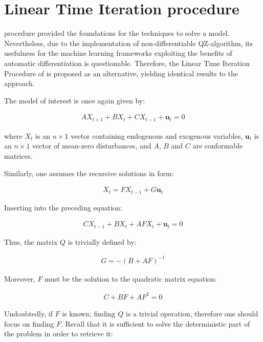 \documentclass{pracamgr}
\numberwithin{equation}{section}
\begin{document}
\section{Linear Time Iteration procedure} \label{LTI}

\citet{uhlig1998toolkit} procedure provided the foundations for the techniques to solve a  \citet{smets2003estimated} model. Nevertheless, due to the implementation of non-differentiable QZ-algorithm, its usefulness for the machine learning frameworks exploiting the benefits of automatic differentiation is questionable. Therefore, the Linear Time Iteration Procedure of \cite{rendahl2017linear} is proposed as an alternative, yielding identical results to the \citet{uhlig1998toolkit} approach.

The model of interest is once again given by:

\begin{align}
AX_{t+1} + BX_{t} + CX_{t-1} + \mathbf{u}_{t} = 0
\end{align}

where $X_{t}$ is an $n \times 1$ vector containing endogenous and exogenous variables, $\mathbf{u}_{t}$ is an $n \times 1$ vector of mean-zero disturbances, and $A$, $B$ and $C$ are conformable matrices.

Similarly, one assumes the recursive solutions in form:

\begin{align}
X_{t} = FX_{t-1} + G\mathbf{u}_{t}
\end{align}

Inserting into the preceding equation:

\begin{align}
CX_{t-1} + BX_{t} + AFX_{t} + \mathbf{u}_{t} = 0
\end{align}

Thus, the matrix $Q$ is trivially defined by:

\begin{align}
G = -\left( B + AF \right)^{-1}
\end{align}

Moreover, $F$ must be the solution to the quadratic matrix equation:

\begin{align}
C + BF + AF^{2} = 0
\end{align}

Undoubtedly, if $F$ is known, finding $Q$ is a trivial operation, therefore one should focus on finding $F$. Recall that it is sufficient to solve the deterministic part of the problem in order to retrieve it:
\end{document}
